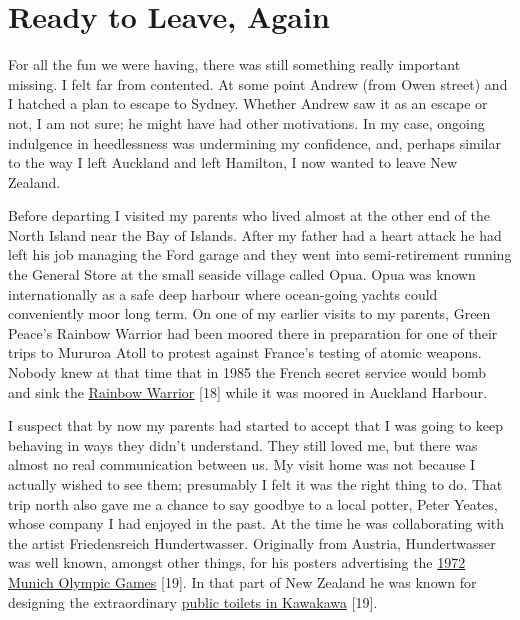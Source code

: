 \chapter{Ready to Leave, Again}

For all the fun we were having, there was still something really
important missing. I felt far from contented. At some point Andrew (from
Owen street) and I hatched a plan to escape to Sydney. Whether Andrew
saw it as an escape or not, I am not sure; he might have had other
motivations. In my case, ongoing indulgence in heedlessness was
undermining my confidence, and, perhaps similar to the way I left
Auckland and left Hamilton, I now wanted to leave New Zealand.

Before departing I visited my parents who lived almost at the other end
of the North Island near the Bay of Islands. After my father had a heart
attack he had left his job managing the Ford garage and they went into
semi-retirement running the General Store at the small seaside village
called Opua. Opua was known internationally as a safe deep harbour where
ocean-going yachts could conveniently moor long term. On one of my
earlier visits to my parents, Green Peace's Rainbow Warrior had been
moored there in preparation for one of their trips to Mururoa Atoll to
protest against France's testing of atomic weapons. Nobody knew at that
time that in 1985 the French secret service would bomb and sink the
\href{https://www.greenpeace.org/new-zealand/about/our-history/bombing-of-the-rainbow-warrior/}{\underline{Rainbow
Warrior}} {[}18{]} while it was moored in Auckland Harbour.

I suspect that by now my parents had started to accept that I was going
to keep behaving in ways they didn't understand. They still loved me,
but there was almost no real communication between us. My visit home was
not because I actually wished to see them; presumably I felt it was the
right thing to do. That trip north also gave me a chance to say goodbye
to a local potter, Peter Yeates, whose company I had enjoyed in the
past. At the time he was collaborating with the artist Friedensreich
Hundertwasser. Originally from Austria, Hundertwasser was well known,
amongst other things, for his posters advertising the
\href{https://hundertwasser.com/en/original-graphic/700_hwg54_olympische_spiele_muenchen_1972__13}{\underline{1972
Munich Olympic Games}} {[}19{]}. In that part of New Zealand he was
known for designing the extraordinary
\href{http://www.hundertwasser.at/english/oeuvre/arch/arch_kawakawa.php}{\underline{public
toilets in Kawakawa}} {[}19{]}.

